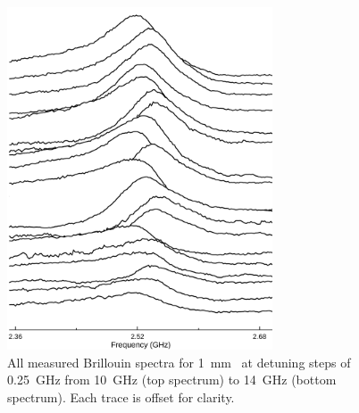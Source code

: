 \begin{figure}[ht]
  \centering
  \includegraphics[width=0.7\textwidth]{figs/3-CoBS/JoyDivisionCoBSCS2.pdf}
  \caption{All measured Brillouin spectra for \SI{1}{\milli\meter}~ at detuning steps of \SI{0.25}{\giga\hertz} from \SI{10}{\giga\hertz} (top spectrum) to \SI{14}{\giga\hertz} (bottom spectrum). Each trace is offset for clarity.}
  \label{fig:Joy Division CS2}
\end{figure}

\FloatBarrier

